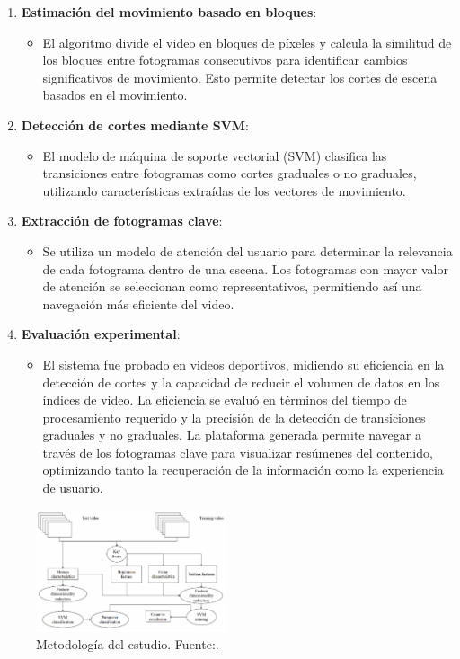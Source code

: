 \begin{enumerate}
	\item \textbf{Estimación del movimiento basado en bloques}:
	\begin{itemize}
		\item El algoritmo divide el video en bloques de píxeles y calcula la similitud de los bloques entre fotogramas consecutivos para identificar cambios significativos de movimiento. Esto permite detectar los cortes de escena basados en el movimiento.
	\end{itemize}
	
	\item \textbf{Detección de cortes mediante SVM}:
	\begin{itemize}
		\item El modelo de máquina de soporte vectorial (SVM) clasifica las transiciones entre fotogramas como cortes graduales o no graduales, utilizando características extraídas de los vectores de movimiento.
	\end{itemize}
	
	\item \textbf{Extracción de fotogramas clave}:
	\begin{itemize}
		\item Se utiliza un modelo de atención del usuario para determinar la relevancia de cada fotograma dentro de una escena. Los fotogramas con mayor valor de atención se seleccionan como representativos, permitiendo así una navegación más eficiente del video.
	\end{itemize}
	
	\item \textbf{Evaluación experimental}:
	\begin{itemize}
		\item El sistema fue probado en videos deportivos, midiendo su eficiencia en la detección de cortes y la capacidad de reducir el volumen de datos en los índices de video. La eficiencia se evaluó en términos del tiempo de procesamiento requerido y la precisión de la detección de transiciones graduales y no graduales. La plataforma generada permite navegar a través de los fotogramas clave para visualizar resúmenes del contenido, optimizando tanto la recuperación de la información como la experiencia de usuario.
	\end{itemize}

\end{enumerate}

\begin{figure}[H]
	\centering
	\includegraphics[width=0.5\textwidth]{2/figures/Metodologia_ant_5.png}
	\caption{Metodología del estudio. Fuente:\cite {wang2023shear}.}
	\label{fig:etiqueta_de_la_figura}
\end{figure}


